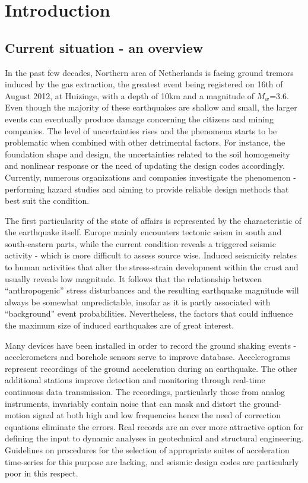 \documentclass[10pt,a4paper]{report}
\begin{document}
\tableofcontents
	
\chapter{Introduction}
\section{Current situation - an overview}
In the past few decades, Northern area of Netherlands is facing ground tremors induced by the gas extraction, the greatest event being registered on 16th of August 2012, at Huizinge, with a depth of 10km and a magnitude of $M_w$=3.6. Even though the majority of these earthquakes are shallow and small, the larger events can eventually produce damage concerning the citizens and mining companies. The level of uncertainties rises and the phenomena starts to be problematic when combined with other detrimental factors. For instance, the foundation shape and design, the uncertainties related to the soil homogeneity and nonlinear response or the need of updating the design codes accordingly. Currently, numerous organizations and companies investigate the phenomenon - performing hazard studies and aiming to provide reliable design methods that best suit the condition. 

The first particularity of the state of affairs is represented by the characteristic of the earthquake itself. Europe mainly encounters tectonic seism in south and south-eastern parts, while the current condition reveals a triggered seismic activity - which is more difficult to assess source wise. Induced seismicity relates to human activities that alter the stress-strain development within the crust and usually reveals low magnitude. It follows that the relationship between “anthropogenic” stress disturbances and the resulting earthquake magnitude will always be somewhat unpredictable, insofar as it is partly associated with “background” event probabilities. Nevertheless, the factors that could influence the maximum size of induced earthquakes are of great interest. 

Many devices have been installed in order to record the ground shaking events - accelerometers and borehole sensors serve to improve database. Accelerograms represent recordings of the ground acceleration during an earthquake. The other additional stations improve detection and monitoring through real-time continuous data transmission. The recordings, particularly those from analog instruments, invariably contain noise that can mask and distort the ground-motion signal at both high and low frequencies hence the need of correction equations eliminate the errors.  Real records are an ever more attractive option for defining the input to dynamic analyses in geotechnical and structural engineering. Guidelines on procedures for the selection of appropriate suites of acceleration time-series for this purpose are lacking, and seismic design codes are particularly poor in this respect. 
\end{document}
